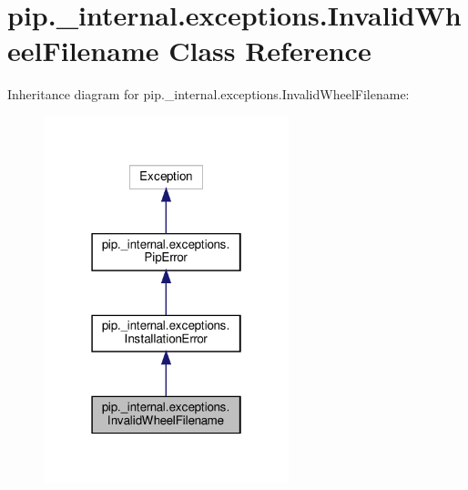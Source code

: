 \hypertarget{classpip_1_1__internal_1_1exceptions_1_1InvalidWheelFilename}{}\section{pip.\+\_\+internal.\+exceptions.\+Invalid\+Wheel\+Filename Class Reference}
\label{classpip_1_1__internal_1_1exceptions_1_1InvalidWheelFilename}


Inheritance diagram for pip.\+\_\+internal.\+exceptions.\+Invalid\+Wheel\+Filename\+:
\nopagebreak
\begin{figure}[H]
\begin{center}
\leavevmode
\includegraphics[width=202pt]{classpip_1_1__internal_1_1exceptions_1_1InvalidWheelFilename__inherit__graph}
\end{center}
\end{figure}


